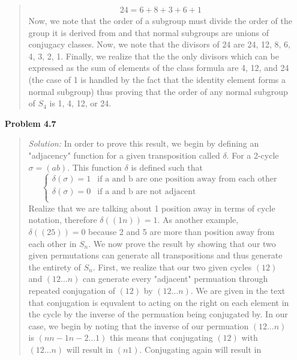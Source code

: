\documentclass{article}
\newcommand{\Solution}{\textit{Solution: }}
\begin{document}
\begin{enumerate}
\begin{quote}
            \begin{align*}
                24 = 6 + 8 + 3 + 6 + 1
            \end{align*} Now, we note that the order of a subgroup must divide the order of the group it is derived from and that normal subgroups are unions of conjugacy classes.
            Now, we note that the divisors of $24$ are 24, 12, 8, 6, 4, 3, 2, 1. Finally, we realize that the the only divisors which can be expressed as the sum of elements of the 
            class formula are 4, 12, and 24 (the case of 1 is handled by the fact that the identity element forms a normal subgroup) thus proving that the order of any normal subgroup of
            $S_4$ is 1, 4, 12, or 24. \qedsymbol 
        \end{quote}
        \item[\textbf{Problem 4.7}]
        \begin{quote}
            \Solution In order to prove this result, we begin by defining an "adjacency" function for a given transposition called $\delta$. For a 2-cycle $\sigma = (ab)$. 
            This function $\delta$ is defined such that 
            \begin{equation*}
                \begin{cases}
                    \delta(\sigma) = 1 & \mbox{if a and b are one position away from each other} \\
                    \delta(\sigma) = 0 & \mbox{if a and b are not adjacent} \\
                \end{cases}
            \end{equation*}
            Realize that we are talking about 1 position away in terms of cycle notation, therefore $\delta((1n)) = 1$. As another example, $\delta((25)) = 0$ because 2 and 5 are more than 
            position away from each other in $S_n$.
            We now prove the result by showing that our two given permutations can generate all transpositions and thus generate the entirety of $S_n$.
            First, we realize that our two given cycles $(12)$ and $(12\dots n)$ can generate every "adjacent" permuation through repeated conjugation of $(12)$ by $(12\dots n)$. We are given 
            in the text that conjugation is equvalent to acting on the right on each element in the cycle by the inverse of the permuation being conjugated by. In our case, we begin by noting 
            that the inverse of our permuation $(12\dots n)$ is $(nn-1n-2\dots 1)$ this means that conjugating $(12)$ with $(12\dots n)$ will result in $(n1)$. Conjugating again will result in 

\end{quote}
\end{enumerate}
\end{document}
